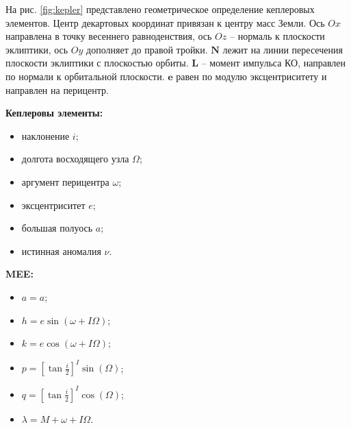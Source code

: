 На рис. \ref{fig:kepler} представлено геометрическое определение кеплеровых элементов.
Центр декартовых координат привязан к центру масс Земли. Ось $Ox$ направлена в точку весеннего равноденствия, 
ось $Oz$ -- нормаль к плоскости эклиптики, 
ось $Oy$ дополняет до правой тройки.
$\mathbf{N}$ лежит на линии пересечения плоскости эклиптики с плоскостью орбиты.
$\mathbf{L}$ -- момент импульса КО, направлен по нормали к орбитальной плоскости. 
$\mathbf{e}$ равен по модулю эксцентриситету и направлен на перицентр.

\begin{center}
    \begin{minipage}[t]{0.45\textwidth}
        \vspace{0pt}
        \textbf{Кеплеровы элементы:}
        \begin{itemize}
            \item наклонение $i$;
            \item долгота восходящего узла $\Omega$;
            \item аргумент перицентра $\omega$;
            \item эксцентриситет $e$;
            \item большая полуось $a$;
            \item истинная аномалия $\nu$.
        \end{itemize}
    \end{minipage}
    \hspace{1cm}
    \begin{minipage}[t]{0.45\textwidth}
        \vspace{0pt}
        \textbf{MEE:}
        \begin{itemize}
            \item $a = a$;
            \item $h = e \sin\left(\omega + I \Omega \right)$;
            \item $k = e \cos\left(\omega + I \Omega \right)$;
            \item $p = \left[\tan{\frac{i}{2}}\right]^I \sin(\Omega)$;
            \item $q = \left[\tan{\frac{i}{2}}\right]^I \cos(\Omega)$;
            \item $\lambda = M + \omega + I \Omega$.
        \end{itemize}
    \end{minipage}
\end{center}

